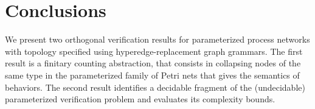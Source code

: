 \enlargethispage{5mm}

\vspace*{-.7\baselineskip}
\section{Conclusions}

We present two orthogonal verification results for parameterized
process networks with topology specified using hyperedge-replacement
graph grammars. The first result is a finitary counting abstraction,
that consists in collapsing nodes of the same type in the
parameterized family of Petri nets that gives the semantics of
behaviors. The second result identifies a decidable fragment of the
(undecidable) parameterized verification problem and evaluates its
complexity bounds.
